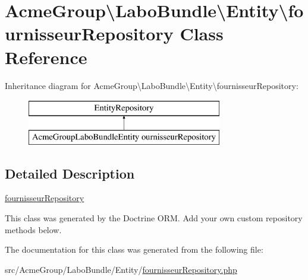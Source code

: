 \hypertarget{class_acme_group_1_1_labo_bundle_1_1_entity_1_1fournisseur_repository}{\section{Acme\+Group\textbackslash{}Labo\+Bundle\textbackslash{}Entity\textbackslash{}fournisseur\+Repository Class Reference}
\label{class_acme_group_1_1_labo_bundle_1_1_entity_1_1fournisseur_repository}
}
Inheritance diagram for Acme\+Group\textbackslash{}Labo\+Bundle\textbackslash{}Entity\textbackslash{}fournisseur\+Repository\+:\begin{figure}[H]
\begin{center}
\leavevmode
\includegraphics[height=2.000000cm]{class_acme_group_1_1_labo_bundle_1_1_entity_1_1fournisseur_repository}
\end{center}
\end{figure}


\subsection{Detailed Description}
\hyperlink{class_acme_group_1_1_labo_bundle_1_1_entity_1_1fournisseur_repository}{fournisseur\+Repository}

This class was generated by the Doctrine O\+R\+M. Add your own custom repository methods below. 

The documentation for this class was generated from the following file\+:\begin{DoxyCompactItemize}
\item 
src/\+Acme\+Group/\+Labo\+Bundle/\+Entity/\hyperlink{fournisseur_repository_8php}{fournisseur\+Repository.\+php}\end{DoxyCompactItemize}
